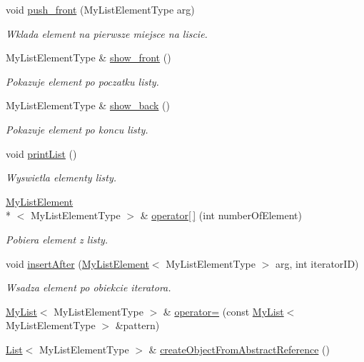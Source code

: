 \begin{DoxyCompactItemize}
void \hyperlink{class_my_list_aafeb562fa9d79f171a21988afd08a833}{push\-\_\-front} (My\-List\-Element\-Type arg)
\begin{DoxyCompactList}\small\item\em Wklada element na pierwsze miejsce na liscie. \end{DoxyCompactList}\item 
My\-List\-Element\-Type \& \hyperlink{class_my_list_a2fe6cb1e5caf9f1d7d9df4b44faf8506}{show\-\_\-front} ()
\begin{DoxyCompactList}\small\item\em Pokazuje element po poczatku listy. \end{DoxyCompactList}\item 
My\-List\-Element\-Type \& \hyperlink{class_my_list_a0ea03d38dcf8c5cdf1ff27ea56fe490b}{show\-\_\-back} ()
\begin{DoxyCompactList}\small\item\em Pokazuje element po koncu listy. \end{DoxyCompactList}\item 
void \hyperlink{class_my_list_adc482b791b4ba4ce44a4561c2739a334}{print\-List} ()
\begin{DoxyCompactList}\small\item\em Wyswietla elementy listy. \end{DoxyCompactList}\item 
\hyperlink{class_my_list_element}{My\-List\-Element}\\*
$<$ My\-List\-Element\-Type $>$ \& \hyperlink{class_my_list_a21f48f2665a0c7e6916e40be613b16aa}{operator\mbox{[}$\,$\mbox{]}} (int number\-Of\-Element)
\begin{DoxyCompactList}\small\item\em Pobiera element z listy. \end{DoxyCompactList}\item 
void \hyperlink{class_my_list_a4a37731b07380f33203de13f926f1ebf}{insert\-After} (\hyperlink{class_my_list_element}{My\-List\-Element}$<$ My\-List\-Element\-Type $>$ arg, int iterator\-I\-D)
\begin{DoxyCompactList}\small\item\em Wsadza element po obiekcie iteratora. \end{DoxyCompactList}\item 
\hyperlink{class_my_list}{My\-List}$<$ My\-List\-Element\-Type $>$ \& \hyperlink{class_my_list_abe6b0de77f1f5918ea26035060efff85}{operator=} (const \hyperlink{class_my_list}{My\-List}$<$ My\-List\-Element\-Type $>$ \&pattern)
\item 
\hyperlink{class_list}{List}$<$ My\-List\-Element\-Type $>$ \& \hyperlink{class_my_list_a819195298125d5b7ee02f18bd4d1152a}{create\-Object\-From\-Abstract\-Reference} ()
\end{DoxyCompactItemize}

